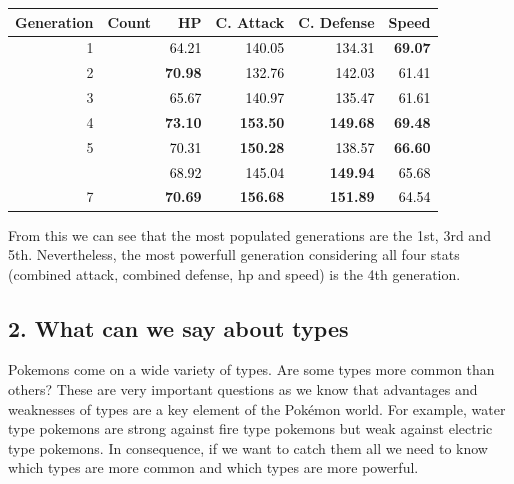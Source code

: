\documentclass[
]{article}
\begin{document}
\begin{longtable}[t]{r>{}r>{}r>{}r>{}r>{}r}
\toprule
Generation & Count & HP & C. Attack & C. Defense & Speed\\
\midrule
1 & \cellcolor[HTML]{23898E}{151} & \textcolor{black}{64.21} & \textcolor{black}{140.05} & \textcolor{black}{134.31} & \textcolor[HTML]{830702}{\textbf{69.07}}\\
2 & \cellcolor{transparent}{100} & \textcolor[HTML]{830702}{\textbf{70.98}} & \textcolor{black}{132.76} & \textcolor{black}{142.03} & \textcolor{black}{61.41}\\
3 & \cellcolor[HTML]{2C718E}{135} & \textcolor{black}{65.67} & \textcolor{black}{140.97} & \textcolor{black}{135.47} & \textcolor{black}{61.61}\\
4 & \cellcolor{transparent}{107} & \textcolor[HTML]{830702}{\textbf{73.10}} & \textcolor[HTML]{830702}{\textbf{153.50}} & \textcolor[HTML]{830702}{\textbf{149.68}} & \textcolor[HTML]{830702}{\textbf{69.48}}\\
5 & \cellcolor[HTML]{21908C}{156} & \textcolor{black}{70.31} & \textcolor[HTML]{C72703}{\textbf{150.28}} & \textcolor{black}{138.57} & \textcolor[HTML]{C72703}{\textbf{66.60}}\\
\addlinespace
6 & \cellcolor{transparent}{72} & \textcolor{black}{68.92} & \textcolor{black}{145.04} & \textcolor[HTML]{830702}{\textbf{149.94}} & \textcolor{black}{65.68}\\
7 & \cellcolor{transparent}{81} & \textcolor[HTML]{C72703}{\textbf{70.69}} & \textcolor[HTML]{830702}{\textbf{156.68}} & \textcolor[HTML]{830702}{\textbf{151.89}} & \textcolor{black}{64.54}\\
\bottomrule
\end{longtable}

From this we can see that the most populated generations are the 1st,
3rd and 5th. Nevertheless, the most powerfull generation considering all
four stats (combined attack, combined defense, hp and speed) is the 4th
generation.

\subsection{2. What can we say about
types}\label{what-can-we-say-about-types}

Pokemons come on a wide variety of types. Are some types more common
than others? These are very important questions as we know that
advantages and weaknesses of types are a key element of the Pokémon
world. For example, water type pokemons are strong against fire type
pokemons but weak against electric type pokemons. In consequence, if we
want to catch them all we need to know which types are more common and
which types are more powerful.
\end{document}

